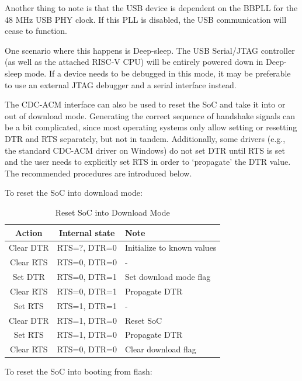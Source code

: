 \documentclass[main\_\_EN.tex]{subfiles}
\begin{document}
Another thing to note is that the USB device is dependent on the BBPLL for the 48 MHz USB PHY clock. If this PLL is disabled, the USB communication will cease to function.

One scenario where this happens is Deep-sleep. The USB Serial/JTAG controller (as well as the attached RISC-V CPU) will be entirely powered down in Deep-sleep mode. If a device needs to be debugged in this mode, it may be preferable to use an external JTAG debugger and a serial interface instead.

The CDC-ACM interface can also be used to reset the SoC and take it into or out of download mode. Generating the correct sequence of handshake signals can be a bit complicated, since most operating systems only allow setting or resetting DTR and RTS separately, but not in tandem. Additionally, some drivers (e.g., the standard CDC-ACM driver on Windows) do not set DTR until RTS is set and the user needs to explicitly set RTS in order to `propagate' the DTR value. The recommended procedures are introduced below.

To reset the SoC into download mode:

\begin{table}[H]
    \centering
    \caption{Reset SoC into Download Mode}
    \label{tab:usbserialjtag-reset-soc-into-download-mode}
    \begin{tabular} {|c|c|l|}
    \hline
        \rowcolor{lightgray}
        \textbf{Action} & \textbf{Internal state} & \textbf{Note} \\\hline
        
        Clear DTR & RTS=?, DTR=0 & Initialize to known values \\\hline
        Clear RTS & RTS=0, DTR=0 & - \\\hline
        Set DTR & RTS=0, DTR=1 & Set download mode flag \\\hline
        Clear RTS & RTS=0, DTR=1 & Propagate DTR \\\hline
        Set RTS & RTS=1, DTR=1 & - \\\hline
        Clear DTR & RTS=1, DTR=0 & Reset SoC \\\hline
        Set RTS & RTS=1, DTR=0 & Propagate DTR \\\hline
        Clear RTS & RTS=0, DTR=0 & Clear download flag\\\hline
    \end{tabular}
\end{table}

To reset the SoC into booting from flash:
\end{document}

